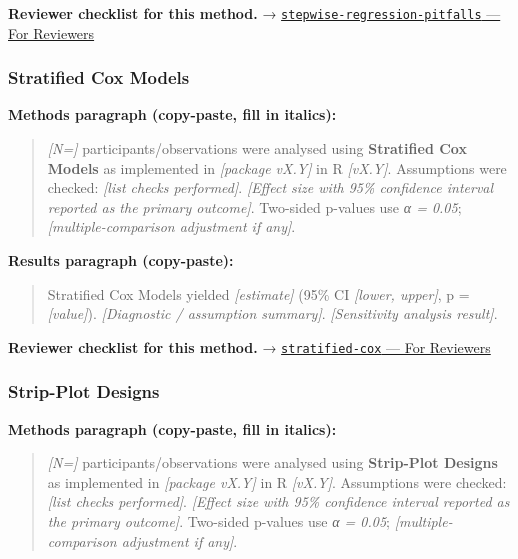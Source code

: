 \documentclass[
]{article}
\begin{document}
\textbf{Reviewer checklist for this method.} →
\href{../chapters/07-regression/stepwise-regression-pitfalls.Rmd\#for-reviewers}{\texttt{stepwise-regression-pitfalls}
--- For Reviewers}

\subsubsection{Stratified Cox Models}\label{stratified-cox-models}

\textbf{Methods paragraph (copy-paste, fill in italics):}

\begin{quote}
\emph{{[}N={]}} participants/observations were analysed using
\textbf{Stratified Cox Models} as implemented in \emph{{[}package
vX.Y{]}} in R \emph{{[}vX.Y{]}}. Assumptions were checked: \emph{{[}list
checks performed{]}}. \emph{{[}Effect size with 95\% confidence interval
reported as the primary outcome{]}}. Two-sided p-values use \emph{α =
0.05}; \emph{{[}multiple-comparison adjustment if any{]}}.
\end{quote}

\textbf{Results paragraph (copy-paste):}

\begin{quote}
Stratified Cox Models yielded \emph{{[}estimate{]}} (95\% CI
\emph{{[}lower, upper{]}}, p = \emph{{[}value{]}}). \emph{{[}Diagnostic
/ assumption summary{]}}. \emph{{[}Sensitivity analysis result{]}}.
\end{quote}

\textbf{Reviewer checklist for this method.} →
\href{../chapters/11-survival/stratified-cox.Rmd\#for-reviewers}{\texttt{stratified-cox}
--- For Reviewers}

\subsubsection{Strip-Plot Designs}\label{strip-plot-designs}

\textbf{Methods paragraph (copy-paste, fill in italics):}

\begin{quote}
\emph{{[}N={]}} participants/observations were analysed using
\textbf{Strip-Plot Designs} as implemented in \emph{{[}package vX.Y{]}}
in R \emph{{[}vX.Y{]}}. Assumptions were checked: \emph{{[}list checks
performed{]}}. \emph{{[}Effect size with 95\% confidence interval
reported as the primary outcome{]}}. Two-sided p-values use \emph{α =
0.05}; \emph{{[}multiple-comparison adjustment if any{]}}.
\end{quote}
\end{document}
